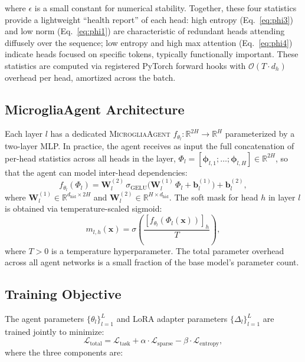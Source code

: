 \documentclass{article}
\newcommand{\agent}{\textsc{MicrogliaAgent}}
\newcommand{\Lcal}{\mathcal{L}}
\newcommand{\phivec}{\boldsymbol{\phi}}
\newcommand{\R}{\mathbb{R}}
\begin{document}
where $\epsilon$ is a small constant for numerical stability. Together, these four statistics
provide a lightweight ``health report'' of each head: high entropy (Eq.~\ref{eq:phi3}) and
low norm (Eq.~\ref{eq:phi1}) are characteristic of redundant heads attending diffusely over
the sequence; low entropy and high max attention (Eq.~\ref{eq:phi4}) indicate heads focused
on specific tokens, typically functionally important. These statistics are computed via
registered PyTorch forward hooks with $\mathcal{O}(T \cdot d_h)$ overhead per head,
amortized across the batch.

\subsection{MicrogliaAgent Architecture}
\label{sec:method_agent}

Each layer $l$ has a dedicated \agent{} $f_{\theta_l} : \R^{2H} \to \R^H$ parameterized by
a two-layer MLP. In practice, the agent receives as input the full concatenation of per-head
statistics across all heads in the layer, $\Phi_l = [\phivec_{l,1}; \ldots; \phivec_{l,H}]
\in \R^{2H}$, so that the agent can model inter-head dependencies:
\[
  f_{\theta_l}(\Phi_l) =
    \mathbf{W}^{(2)}_l\,\sigma_{\text{GELU}}\!\bigl(
      \mathbf{W}^{(1)}_l\,\Phi_l + \mathbf{b}^{(1)}_l
    \bigr) + \mathbf{b}^{(2)}_l,
\]
where $\mathbf{W}^{(1)}_l \in \R^{d_{\text{hid}} \times 2H}$ and
$\mathbf{W}^{(2)}_l \in \R^{H \times d_{\text{hid}}}$.
The soft mask for head $h$ in layer $l$ is obtained via temperature-scaled sigmoid:
\begin{equation}
  m_{l,h}(\mathbf{x}) = \sigma\!\left(\frac{[f_{\theta_l}(\Phi_l(\mathbf{x}))]_h}{T}\right),
  \label{eq:mask}
\end{equation}
where $T > 0$ is a temperature hyperparameter. The total parameter overhead across all
agent networks is a small fraction of the base model's parameter count.

\subsection{Training Objective}
\label{sec:method_loss}

The agent parameters $\{\theta_l\}_{l=1}^{L}$ and LoRA adapter parameters
$\{\Delta_l\}_{l=1}^{L}$ are trained jointly to minimize:
\begin{equation}
  \Lcal_{\text{total}} = \Lcal_{\text{task}} + \alpha \cdot \Lcal_{\text{sparse}}
                         - \beta \cdot \Lcal_{\text{entropy}},
  \label{eq:loss}
\end{equation}
where the three components are:
\end{document}
